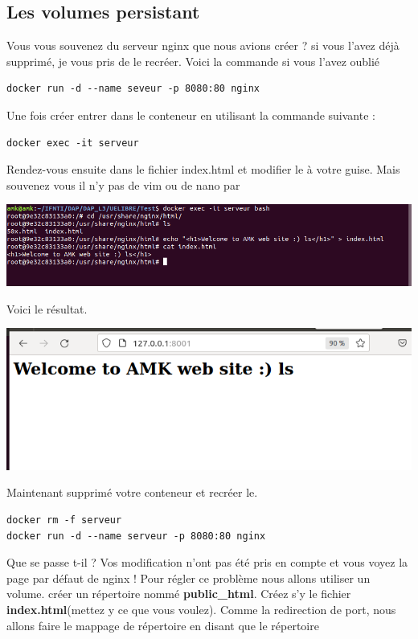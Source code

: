 \documentclass[12pt,a4paper]{article}
\begin{document}
\subsection{Les volumes persistant}
Vous vous souvenez du serveur nginx que nous avions créer ? si 
vous l'avez déjà supprimé, je vous pris de le recréer. Voici
la commande si vous l'avez oublié
\begin{verbatim}
docker run -d --name seveur -p 8080:80 nginx
\end{verbatim}
Une fois créer entrer dans le conteneur en utilisant la commande suivante :
\begin{verbatim}
docker exec -it serveur
\end{verbatim}
Rendez-vous ensuite dans le fichier index.html et modifier le à votre guise. Mais souvenez vous il n'y pas de vim ou de nano par
\begin{center}
\includegraphics[scale=0.3]{img/volume_persistant_1.png}
\end{center}
Voici le résultat.
\begin{center}
\includegraphics[scale=0.3]{img/volume_persistant.png}
\end{center}
Maintenant supprimé votre conteneur et recréer le.
\begin{verbatim}
docker rm -f serveur
docker run -d --name serveur -p 8080:80 nginx
\end{verbatim}
Que se passe t-il ?
Vos modification n'ont pas été pris en compte et vous voyez la
page par défaut de nginx ! 
Pour régler ce problème nous allons utiliser un volume. créer un 
répertoire nommé \textbf{public\_html}. Créez s'y le fichier
\textbf{index.html}(mettez y ce que vous voulez).
Comme la redirection de port, nous allons 
faire le mappage de répertoire en disant que le répertoire 
\end{document}
